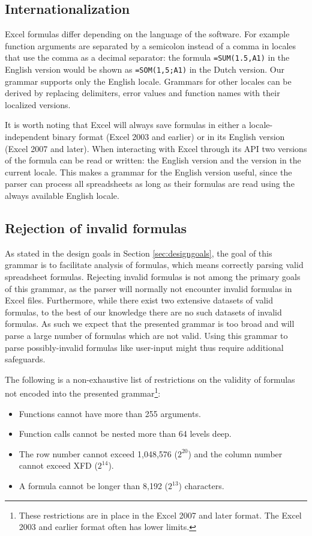 \documentclass[conference]{IEEEtran}
\begin{document}
\subsection{Internationalization}

Excel formulas differ depending on the language of the software. For example function arguments are separated by a semicolon instead of a comma in locales that use the comma as a decimal separator: the formula \texttt{=SUM(1.5,A1)} in the English version would be shown as \texttt{=SOM(1,5;A1)} in the Dutch version.
Our grammar supports only the English locale.
Grammars for other locales can be derived by replacing delimiters, error values and function names with their localized versions.

It is worth noting that Excel will always save formulas in either a locale-independent binary format (Excel 2003 and earlier) or in its English version (Excel 2007 and later). When interacting with Excel through its API two versions of the formula can be read or written: the English version and the version in the current locale.
This makes a grammar for the English version useful, since the parser can process all spreadsheets as long as their formulas are read using the always available English locale.

\subsection{Rejection of invalid formulas}

As stated in the design goals in Section \ref{sec:designgoals}, the goal of this grammar is to facilitate analysis of formulas, which means correctly parsing valid spreadsheet formulas.
Rejecting invalid formulas is not among the primary goals of this grammar, as the parser will normally not encounter invalid formulas in Excel files.
Furthermore, while there exist two extensive datasets of valid formulas, to the best of our knowledge there are no such datasets of invalid formulas.
As such we expect that the presented grammar is too broad and will parse a large number of formulas which are not valid.
Using this grammar to parse possibly-invalid formulas like user-input might thus require additional safeguards.

The following is a non-exhaustive list of restrictions on the validity of formulas not encoded into the presented grammar\footnote{These restrictions are in place in the Excel 2007 and later format. The Excel 2003 and earlier format often has lower limits.}:
\begin{itemize}
	\item Functions cannot have more than 255 arguments.
	\item Function calls cannot be nested more than 64 levels deep.
	\item The row number cannot exceed 1,048,576 ($2^{20}$) and the column number cannot exceed XFD ($2^{14}$).
	\item A formula cannot be longer than 8,192 ($2^{13}$) characters.
\end{itemize}
\end{document}
